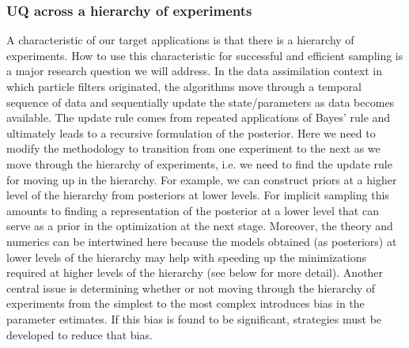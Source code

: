 \documentclass[11pt]{article}
\begin{document}
\subsubsection*{UQ across a hierarchy of experiments}
A characteristic of our target applications is that there is a hierarchy of experiments.
How to use this characteristic for successful and efficient sampling is a major research question we will address.
In the data assimilation context in which particle filters originated, the algorithms move through a temporal sequence of data and sequentially update the state/parameters as data becomes available.
The update rule comes from repeated applications of Bayes' rule and ultimately leads to a recursive formulation of the posterior.
Here we need to modify the methodology to transition from one experiment to the next as we move through the hierarchy of experiments, i.e. we need to find the update rule for moving up in the hierarchy.
For example, we can construct priors at a higher level of the hierarchy from posteriors at lower levels. For implicit sampling this amounts to finding a representation of the posterior at a lower level that can serve as a prior in the optimization at the next stage.
Moreover, the theory and numerics can be intertwined here because the models obtained (as posteriors) at lower levels of the hierarchy may help with speeding up the minimizations required at higher levels of the hierarchy (see below for more detail). 
Another central issue is determining whether or not moving through the hierarchy of experiments from the simplest to the most complex introduces bias in the parameter estimates. If this bias is found to be significant, strategies must be developed to reduce that bias. 
\end{document}

